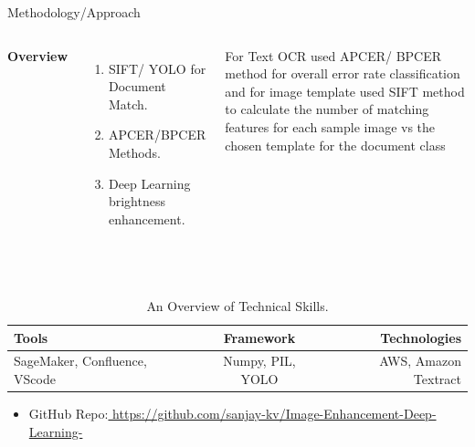 \documentclass[aspectratio=169,xcolor=dvipsnames]{beamer}
\begin{document}
\begin{frame}{Methodology/Approach}
    \tableofcontents

    \begin{columns}[c] %

        \textbf{Overview}
        \begin{enumerate}
            \item SIFT/ YOLO for Document Match.
            \item APCER/BPCER Methods.
            \item Deep Learning brightness enhancement.
        \end{enumerate}

         For Text OCR used APCER/ BPCER method for overall error rate classification and for image template used SIFT method to calculate the number of matching features for each sample image vs the chosen template for the document class

    \end{columns}   \\
    
\begin{table}[h!]
  \begin{center}
    \caption{An Overview of Technical Skills.}
    \label{tab:table1}
    \begin{tabular}{|l|c|r|} %
      \hline
      \textbf{Tools } & \textbf{Framework} & \textbf{Technologies}\\
      
      \hline
      SageMaker, Confluence, VScode & Numpy, PIL, YOLO  & AWS, Amazon Textract  \\
      \hline
     
    \end{tabular}
  \end{center}
\end{table}   \newline
\begin{itemize}
      
    \item \alert{GitHub Repo:}\href{ https://github.com/sanjay-kv/Image-Enhancement-Deep-Learning-}{ https://github.com/sanjay-kv/Image-Enhancement-Deep-Learning-}
 
    \end{itemize}
\end{frame}
\end{document}
